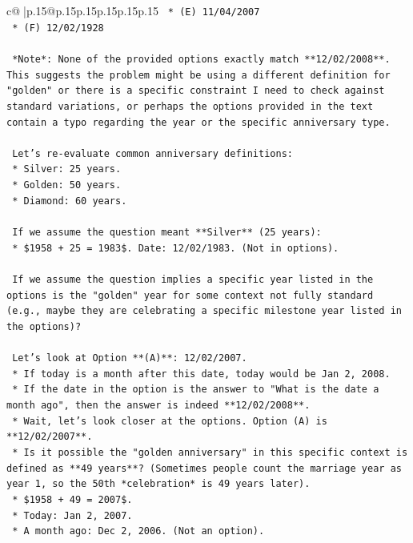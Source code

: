 \documentclass{article}
\begin{document}
{\begin{supertabular}{c@{$\;$}|p{.15\linewidth}@{}p{.15\linewidth}p{.15\linewidth}p{.15\linewidth}p{.15\linewidth}p{.15\linewidth}}
{{{\texttt{    *   (E) 11/04/2007} \\
\texttt{    *   (F) 12/02/1928} \\
\\ 
\texttt{    *Note*: None of the provided options exactly match **12/02/2008**. This suggests the problem might be using a different definition for "golden" or there is a specific constraint I need to check against standard variations, or perhaps the options provided in the text contain a typo regarding the year or the specific anniversary type.} \\
\\ 
\texttt{    Let's re{-}evaluate common anniversary definitions:} \\
\texttt{    *   Silver: 25 years.} \\
\texttt{    *   Golden: 50 years.} \\
\texttt{    *   Diamond: 60 years.} \\
\\ 
\texttt{    If we assume the question meant **Silver** (25 years):} \\
\texttt{    *   \$1958 + 25 = 1983\$. Date: 12/02/1983. (Not in options).} \\
\\ 
\texttt{    If we assume the question implies a specific year listed in the options is the "golden" year for some context not fully standard (e.g., maybe they are celebrating a specific milestone year listed in the options)?} \\
\\ 
\texttt{    Let's look at Option **(A)**: 12/02/2007.} \\
\texttt{    *   If today is a month after this date, today would be Jan 2, 2008.} \\
\texttt{    *   If the date in the option is the answer to "What is the date a month ago", then the answer is indeed **12/02/2008**.} \\
\texttt{    *   Wait, let's look closer at the options. Option (A) is **12/02/2007**.} \\
\texttt{    *   Is it possible the "golden anniversary" in this specific context is defined as **49 years**? (Sometimes people count the marriage year as year 1, so the 50th *celebration* is 49 years later).} \\
\texttt{        *   \$1958 + 49 = 2007\$.} \\
\texttt{        *   Today: Jan 2, 2007.} \\
\texttt{        *   A month ago: Dec 2, 2006. (Not an option).} \\
}}}
\end{supertabular}}
\end{document}
